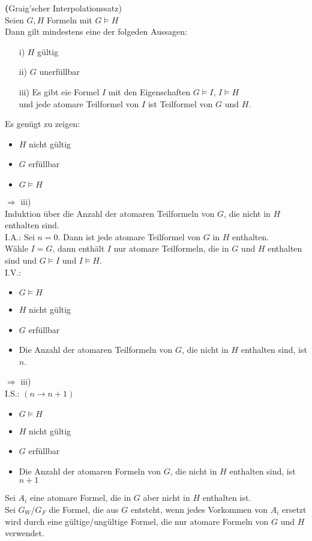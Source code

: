 

 \textbf(Graig'scher Interpolationssatz)\\
Seien $G,H$ Formeln mit $G \models H$\\
Dann gilt mindestens eine der folgeden Aussagen:\\
\begin{enumerate}
\item[i)] $H$ gültig
\item[ii)] $G$ unerfüllbar
\item[iii)] Es gibt eie Formel $I$ mit den Eigenschaften $G \models I$, $I \models H$\\
und jede atomare Teilformel von $I$ ist Teilformel von $G$ und $H$.
\end{enumerate}

\beweis{}
Es genügt zu zeigen:\\
\begin{itemize}
\item $H$ nicht gültig
\item $G$ erfüllbar
\item $G \models H$
\end{itemize}
$\Rightarrow$ iii)\\

\noindent
Induktion über die Anzahl der atomaren Teilformeln von $G$, die nicht in $H$ enthalten sind.\\

\noindent
I.A.: Sei $n=0$. Dann ist jede atomare Teilformel von $G$ in $H$ enthalten.\\
Wähle $I=G$, dann enthält $I$ nur atomare Teilformeln, die in $G$ und $H$ enthalten sind und $G \models I$ und $I \models H$.\\

\noindent
I.V.:
\begin{itemize}
\item $G \models H$ 
\item $H$ nicht gültig
\item $G$ erfüllbar
\item Die Anzahl der atomaren Teilformeln von $G$, die nicht in $H$ enthalten sind, ist $n$.
\end{itemize}
$\Rightarrow$ iii)\\

\noindent
I.S.: $(n \rightarrow n+1)$\\
\begin{itemize}
\item $G \models H$
\item $H$ nicht gültig
\item $G$ erfüllbar
\item Die Anzahl der atomaren Formeln von $G$, die nicht in $H$ enthalten sind, ist $n+1$
\end{itemize}
\noindent
Sei $A_i$ eine atomare Formel, die in $G$ aber nicht in $H$ enthalten ist.\\
Sei $G_W$/$G_F$ die Formel, die aus $G$ entsteht, wenn jedes Vorkommen von $A_i$ ersetzt wird durch eine gültige/ungültige Formel, die nur atomare Formeln von $G$ und $H$ verwendet.\\

